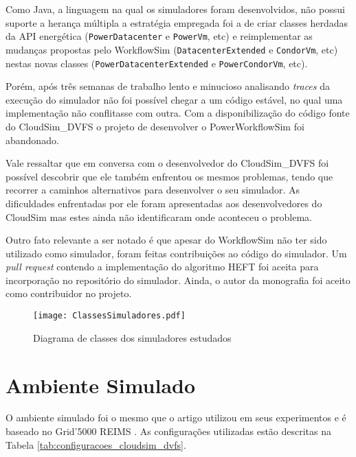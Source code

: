 Como Java, a linguagem na qual os simuladores foram desenvolvidos, não possui
suporte a herança múltipla a estratégia empregada foi a de criar classes
herdadas da API energética (\texttt{PowerDatacenter} e \texttt{PowerVm}, etc) e
reimplementar as mudanças propostas pelo WorkflowSim
(\texttt{DatacenterExtended} e \texttt{CondorVm}, etc) nestas novas
classes (\texttt{PowerDatacenterExtended} e \texttt{PowerCondorVm}, etc).

Porém, após três semanas de trabalho lento e minucioso analisando \emph{traces}
da execução do simulador não foi possível chegar a um código estável, no qual
uma implementação não conflitasse com outra. Com a disponibilização
do código fonte do CloudSim\_DVFS o projeto de desenvolver o PowerWorkflowSim
foi abandonado.

Vale ressaltar que em conversa com o desenvolvedor do CloudSim\_DVFS foi
possível descobrir que ele também enfrentou os mesmos problemas, tendo que
recorrer a caminhos alternativos para desenvolver o seu simulador. As
dificuldades enfrentadas por ele foram apresentadas aos desenvolvedores do
CloudSim mas estes ainda não identificaram onde aconteceu o problema.

Outro fato relevante a ser notado é que apesar do WorkflowSim não ter sido
utilizado como simulador, foram feitas contribuições ao código do simulador.
Um \emph{pull request} contendo a implementação do algoritmo HEFT foi aceita
para incorporação no repositório do simulador. Ainda, o autor da monografia
foi aceito como contribuidor no projeto.

\begin{figure}[ht]
\centering
\texttt{[image: ClassesSimuladores.pdf]}
\caption{Diagrama de classes dos simuladores estudados}
\label{fig:classes_simuladores}
\end{figure}

\section{Ambiente Simulado}
\label{sec:ambiente_simulado}

O ambiente simulado foi o mesmo que o artigo
\cite{guerout:energy_aware_simulation} utilizou em seus experimentos e é baseado
no Grid'5000 REIMS \cite{cappello:grid5000}. As configurações utilizadas estão
descritas na Tabela \ref{tab:configuracoes_cloudsim_dvfs}.

